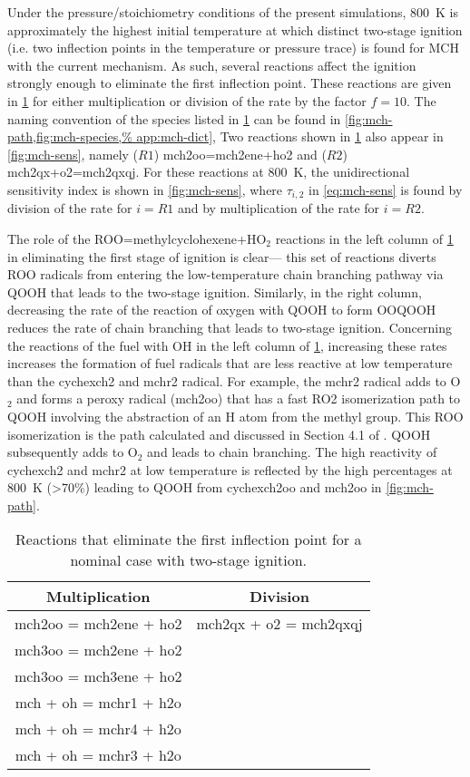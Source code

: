 \documentclass[../main.tex]{subfiles}
\begin{document}
Under the pressure/stoichiometry conditions of the present simulations, \SI{800}{\kelvin}
is approximately the highest initial temperature at which distinct two-stage
ignition (i.e. two inflection points in the temperature or pressure trace) is
found for MCH with the current mechanism. As such, several reactions affect
the ignition strongly enough to eliminate the first inflection point. These
reactions are given in \cref{tab:mch-sens} for either multiplication or
division of the rate by the factor $f=10$. The naming convention of the species
listed in \cref{tab:mch-sens} can be found in \cref{fig:mch-path,fig:mch-species,%
app:mch-dict}, Two reactions shown in
\cref{tab:mch-sens} also appear in \cref{fig:mch-sens}, namely ($R1$)
mch2oo=mch2ene+ho2 and ($R2$) mch2qx+o2=mch2qxqj. For these reactions at \SI{800}{\kelvin},
the unidirectional sensitivity index is shown in \cref{fig:mch-sens}, where $\tau_{i,2}$
in \cref{eq:mch-sens} is found by division of the rate for $i=R1$ and by
multiplication of the rate for $i=R2$.

The role of the ROO=methylcyclohexene+HO$_2$ reactions in the left column of
\cref{tab:mch-sens} in eliminating the first stage of ignition is clear---%
this set of reactions diverts ROO radicals from entering the low-temperature
chain branching pathway via QOOH that leads to the two-stage ignition.
Similarly, in the right column, decreasing the rate of the reaction of oxygen
with QOOH to form OOQOOH reduces the rate of chain branching that leads to
two-stage ignition. Concerning the reactions of the fuel with OH in the left
column of \cref{tab:mch-sens}, increasing these rates increases the
formation of fuel radicals that are less reactive at low temperature than the
cychexch2 and mchr2 radical. For example, the mchr2 radical adds to O$_2$ and
forms a peroxy radical (mch2oo) that has a fast RO2 isomerization path to QOOH
involving the abstraction of an H atom from the methyl group. This ROO
isomerization is the path calculated and discussed in Section 4.1 of
\cite{Weber2014}. QOOH subsequently adds to O$_2$ and leads to chain branching.
The high reactivity of cychexch2 and mchr2 at low temperature is reflected by
the high percentages at \SI{800}{\kelvin} (>70\%) leading to QOOH from cychexch2oo and
mch2oo in \cref{fig:mch-path}.

\begin{table}
    \caption{Reactions that eliminate the first inflection point for a nominal
    case with two-stage ignition.}
    \label{tab:mch-sens}
    \begin{tabular}{c c}
    \toprule
    Multiplication & Division \\
    \midrule
    mch2oo = mch2ene + ho2 & mch2qx + o2 = mch2qxqj \\
    mch3oo = mch2ene + ho2 & \\
    mch3oo = mch3ene + ho2 & \\
    mch + oh = mchr1 + h2o & \\
    mch + oh = mchr4 + h2o & \\
    mch + oh = mchr3 + h2o & \\
    \bottomrule
    \end{tabular}
\end{table}
\end{document}
